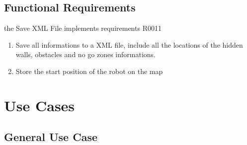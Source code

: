 \documentclass[11pt, a4paper]{report}
\begin{document}
\subsection{Functional Requirements}
the Save XML File implements requirements R0011
\begin{enumerate}
\item Save all informations to a XML file, include all the locations of the hidden walls, obstacles and no go zones informations.
\item Store the start position of the robot on the map  

\end{enumerate}


\section{Use Cases}
\subsection{General Use Case}
\end{document}
